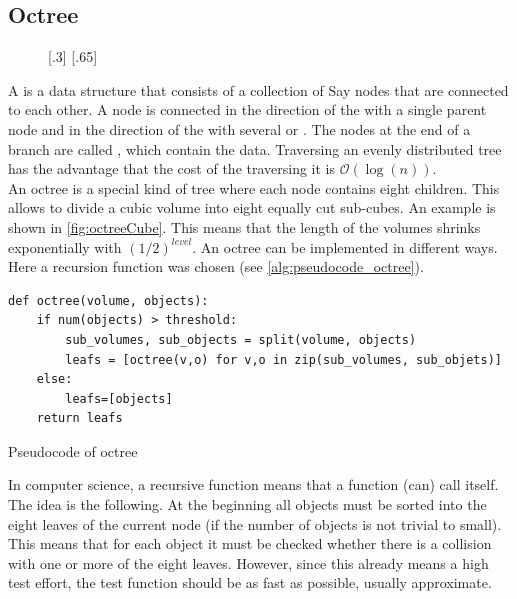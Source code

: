 \subsection{Octree}
% 
\begin{figure}[!t]
    \centering
    [.3\textwidth]{
    \def\tikzheight{0.6\textwidth}
    }
    [.65\textwidth]{
    \def\tikzheight{0.6\textwidth}
    }
	\caption{}
	\label{fig:octree}
\end{figure}
% 
A  is a data structure that consists of a collection of Say nodes that are connected to each other.
A node is connected in the direction of the  with a single parent node and in the direction of the  with several  or .
The nodes at the end of a branch are called , which contain the data.
Traversing an evenly distributed tree has the advantage that the cost of the traversing it is $\mathcal{O}(\log(n))$.
\\
% 
An octree is a special kind of tree where each node contains eight children.
This allows to divide a cubic volume into eight equally cut sub-cubes.
An example is shown in \cref{fig:octreeCube}.
This means that the length of the volumes shrinks exponentially with $(1/2)^\mathit{level}$.
An octree can be implemented in different ways.
Here a recursion function was chosen (see \cref{alg:pseudocode_octree}).
% 
\begin{lstfloat}[!tb]
\lstset{style=python}
\begin{lstlisting}[]
def octree(volume, objects):
    if num(objects) > threshold:
        sub_volumes, sub_objects = split(volume, objects)
        leafs = [octree(v,o) for v,o in zip(sub_volumes, sub_objets)]
    else:
        leafs=[objects]
    return leafs
\end{lstlisting}
\caption{Pseudocode of octree}
\label{alg:pseudocode_octree}
\end{lstfloat}
% 
In computer science, a recursive function means that a function (can) call itself.
The idea is the following.
At the beginning all objects must be sorted into the eight leaves of the current node (if the number of objects is not trivial to small).
This means that for each object it must be checked whether there is a collision with one or more of the eight leaves.
However, since this already means a high test effort, the test function should be as fast as possible, usually approximate.
